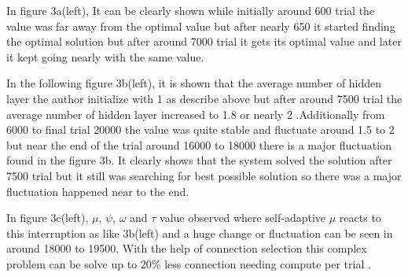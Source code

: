 \documentclass[12pt]{article}
\begin{document}
In figure 3a(left), It can be clearly shown while initially around 600 trial the value was far away from the optimal value but after nearly 650 it started finding the optimal solution but after around 7000 trial it gets its optimal value and later it kept going nearly with the same value.

In the following figure 3b(left),  it is shown that  the average number of hidden layer the author initialize with 1 as describe above but after around 7500 trial the average number of hidden layer increased to 1.8 or nearly 2 .Additionally from 6000 to final trial 20000 the value was quite stable and fluctuate around 1.5 to 2 but near the end of the trial around 16000 to 18000 there is a major fluctuation found in the  figure 3b. It clearly shows that the system solved the solution after 7500 trial but it still was searching for best possible solution so there was a major fluctuation happened near to the end.

In figure 3c(left), $\mu$, $\psi$, $\omega$ and $\tau$ value observed where self-adaptive $\mu$ reacts to this interruption as like 3b(left) and a huge change or fluctuation can be seen in around 18000 to 19500. With the help of connection selection this complex problem can be solve up to 20\% less connection needing compute per trial \cite{10.1145/1068009.1068210}. 
\end{document}
